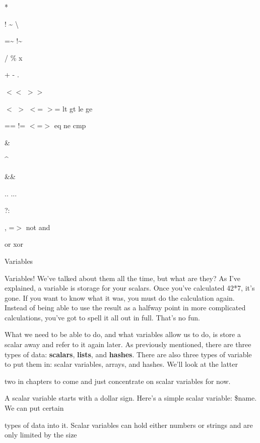 \documentclass[a4paper,11pt]{book}
\begin{document}
\noindent **

\noindent ! \~{} \textbackslash 

\noindent =\~{} !\~{}

\noindent * / \% x

\noindent + - .

\noindent $<$$<$ $>$$>$

\noindent $<$ $>$ $<$= $>$= lt gt le ge

\noindent == != $<$=$>$ eq ne cmp

\noindent \&

\noindent \textbar  \^{}

\noindent \&\&

\noindent \textbar \textbar 

\noindent .. ...

\noindent ?:

\noindent , =$>$ not and

\noindent or xor

\noindent 

\noindent 

\noindent Variables

\noindent 

\noindent Variables! We've talked about them all the time, but what are they? As I've explained, a variable is storage for your scalars. Once you've calculated 42*7, it's gone. If you want to know what it was, you must do the calculation again. Instead of being able to use the result as a halfway point in more complicated calculations, you've got to spell it all out in full. That's no fun.

\noindent 

\noindent What we need to be able to do, and what variables allow us to do, is store a scalar away and refer to it again later. As previously mentioned, there are three types of data: \textbf{scalars}, \textbf{lists}, and \textbf{hashes}. There are also three types of variable to put them in: scalar variables, arrays, and hashes. We'll look at the latter

\noindent two in chapters to come and just concentrate on scalar variables for now.

\noindent 

\noindent A scalar variable starts with a dollar sign. Here's a simple scalar variable: \$name. We can put certain

\noindent types of data into it. Scalar variables can hold either numbers or strings and are only limited by the size
\end{document}
